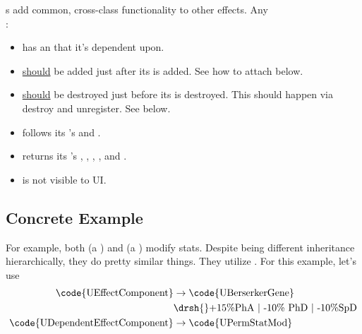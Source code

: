 



s add common, cross-class functionality to other effects. Any \\:

\begin{itemize}
	\item{has an  that it's dependent upon.}
	\item{\ul{should} be added just after its  is added. See how to attach below.}
	\item{\ul{should} be destroyed just before its  is destroyed. This should happen via destroy and unregister. See below.}
	\item{follows its 's  and .}
	\item{returns its 's , , , , and .}
	\item{is not visible to UI.}
\end{itemize}

\subsection{Concrete Example}

For example, both  (a ) and  (a ) modify stats. Despite being different inheritance hierarchically, they do pretty similar things. They utilize . For this example, let's use
\begin{align*}
	\text{\code{UEffectComponent}} &\rightarrow \textrm{\code{UBerserkerGene}}\\
		&\drsh{}\textrm{+15\%PhA $|$ -10\% PhD $|$ -10\%SpD}\\
	\text{\code{UDependentEffectComponent}} &\rightarrow \text{\code{UPermStatMod}}
\end{align*}

